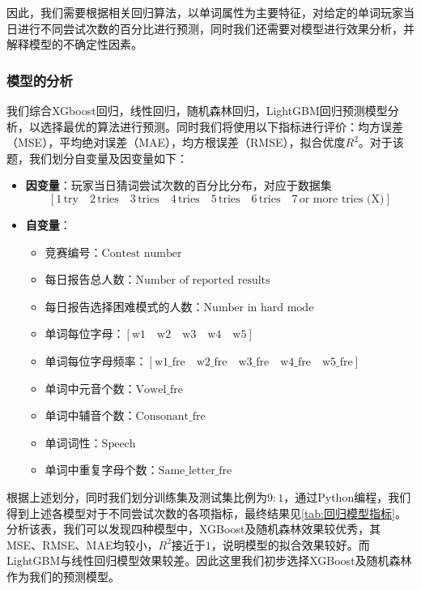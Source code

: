 \documentclass{MathModeling}
\begin{document}
	因此，我们需要根据相关回归算法，以单词属性为主要特征，对给定的单词玩家当日进行不同尝试次数的百分比进行预测，同时我们还需要对模型进行效果分析，并解释模型的不确定性因素。
	\subsubsection{模型的分析}
	我们综合XGboost回归，线性回归，随机森林回归，LightGBM回归预测模型分析，以选择最优的算法进行预测。同时我们将使用以下指标进行评价：均方误差（MSE），平均绝对误差（MAE），均方根误差（RMSE），拟合优度$R^2$。对于该题，我们划分自变量及因变量如下：
	\begin{itemize}
		\item \textbf{因变量}：玩家当日猜词尝试次数的百分比分布，对应于数据集
		$$
		\left[1\,\text{try}\quad2\,\text{tries}\quad3\,\text{tries}\quad4\,\text{tries}\quad5\,\text{tries}\quad6\,\text{tries}\quad7\,\text{or more tries (X)}\right]
		$$
		\item \textbf{自变量}：
		\begin{itemize}
			\item {\heiti 竞赛编号}：$\text{Contest number}$
			\item {\heiti 每日报告总人数}：$\text{Number of reported results}$
			\item {\heiti 每日报告选择困难模式的人数}：$\text{Number in hard mode}$
			\item {\heiti 单词每位字母}：$\left[\text{w1}\quad \text{w2}\quad \text{w3}\quad \text{w4}\quad \text{w5}\right]$
			\item {\heiti 单词每位字母频率}：$\left[\text{w1\_fre}\quad\text{w2\_fre}\quad\text{w3\_fre}\quad\text{w4\_fre}\quad\text{w5\_fre}\right]$
			\item {\heiti 单词中元音个数}：$\text{Vowel\_fre}$
			\item {\heiti 单词中辅音个数}：$\text{Consonant\_fre}$
			\item {\heiti 单词词性}：$\text{Speech}$
			\item {\heiti 单词中重复字母个数}：$\text{Same\_letter\_fre}$
		\end{itemize}
		
	\end{itemize}
	
	根据上述划分，同时我们划分训练集及测试集比例为$9:1$，通过Python编程，我们得到上述各模型对于不同尝试次数的各项指标，最终结果见\textcolor{blue}{\cref{tab:回归模型指标}}。分析该表，我们可以发现四种模型中，XGBoost及随机森林效果较优秀，其MSE、RMSE、MAE均较小，$R^2$接近于$1$，说明模型的拟合效果较好。而LightGBM与线性回归模型效果较差。因此这里我们初步选择XGBoost及随机森林作为我们的预测模型。
\end{document}
